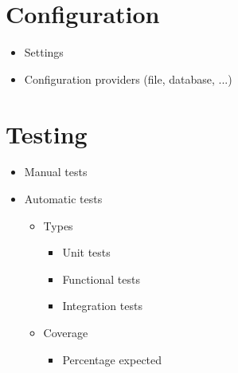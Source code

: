\documentclass[10pt]{article}
\begin{document}
  \section*{Configuration}
  \begin{itemize}    
    \item Settings
    \item Configuration providers (file, database, ...)
  \end{itemize}
  
  \section*{Testing}
  \begin{itemize}
    \item Manual tests
    \item Automatic tests
    \begin{itemize}
      \item Types
      \begin{itemize}
        \item Unit tests
        \item Functional tests
        \item Integration tests
      \end{itemize}
      \item Coverage
      \begin{itemize}
        \item Percentage expected
      \end{itemize}
    \end{itemize}
  \end{itemize}
  
\end{document}

